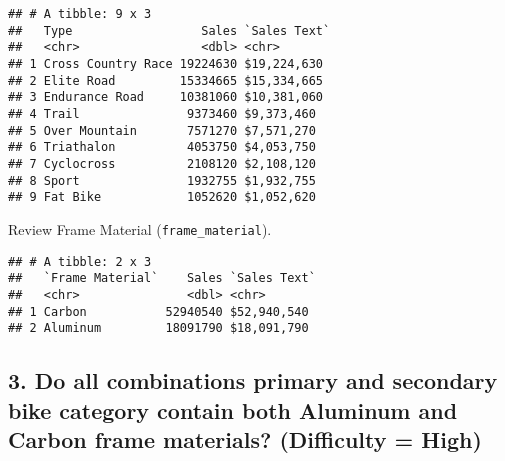 \documentclass[]{article}
\newenvironment{Shaded}{\begin{snugshade}}{\end{snugshade}}
\newcommand{\DataTypeTok}[1]{\textcolor[rgb]{0.13,0.29,0.53}{#1}}
\newcommand{\KeywordTok}[1]{\textcolor[rgb]{0.13,0.29,0.53}{\textbf{#1}}}
\newcommand{\NormalTok}[1]{#1}
\newcommand{\OperatorTok}[1]{\textcolor[rgb]{0.81,0.36,0.00}{\textbf{#1}}}
\newcommand{\StringTok}[1]{\textcolor[rgb]{0.31,0.60,0.02}{#1}}
\begin{document}
\begin{verbatim}
## # A tibble: 9 x 3
##   Type                  Sales `Sales Text`
##   <chr>                 <dbl> <chr>       
## 1 Cross Country Race 19224630 $19,224,630 
## 2 Elite Road         15334665 $15,334,665 
## 3 Endurance Road     10381060 $10,381,060 
## 4 Trail               9373460 $9,373,460  
## 5 Over Mountain       7571270 $7,571,270  
## 6 Triathalon          4053750 $4,053,750  
## 7 Cyclocross          2108120 $2,108,120  
## 8 Sport               1932755 $1,932,755  
## 9 Fat Bike            1052620 $1,052,620
\end{verbatim}

Review Frame Material (\texttt{frame\_material}).

\begin{Shaded}
\end{Shaded}

\begin{verbatim}
## # A tibble: 2 x 3
##   `Frame Material`    Sales `Sales Text`
##   <chr>               <dbl> <chr>       
## 1 Carbon           52940540 $52,940,540 
## 2 Aluminum         18091790 $18,091,790
\end{verbatim}

\hypertarget{do-all-combinations-primary-and-secondary-bike-category-contain-both-aluminum-and-carbon-frame-materials-difficulty-high}{%
\subsection{3. Do all combinations primary and secondary bike category
contain both Aluminum and Carbon frame materials? (Difficulty =
High)}\label{do-all-combinations-primary-and-secondary-bike-category-contain-both-aluminum-and-carbon-frame-materials-difficulty-high}}
\end{document}

